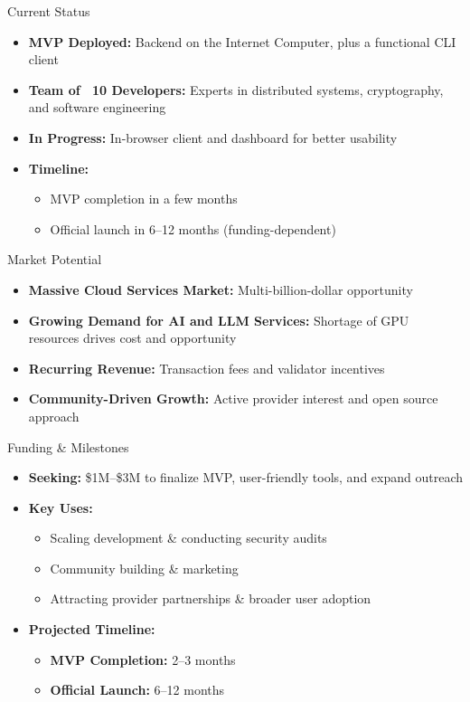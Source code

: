 \documentclass{beamer}
\begin{document}
\begin{frame}{Current Status}
\begin{itemize}
  \item \textbf{MVP Deployed:} Backend on the Internet Computer, plus a functional CLI client
  \item \textbf{Team of ~10 Developers:} Experts in distributed systems, cryptography, and software engineering
  \item \textbf{In Progress:} In-browser client and dashboard for better usability
  \item \textbf{Timeline:}
  \begin{itemize}
    \item MVP completion in a few months
    \item Official launch in 6--12 months (funding-dependent)
  \end{itemize}
\end{itemize}
\end{frame}

\begin{frame}{Market Potential}
\begin{itemize}
  \item \textbf{Massive Cloud Services Market:} Multi-billion-dollar opportunity
  \item \textbf{Growing Demand for AI and LLM Services:} Shortage of GPU resources drives cost and opportunity
  \item \textbf{Recurring Revenue:} Transaction fees and validator incentives
  \item \textbf{Community-Driven Growth:} Active provider interest and open source approach
\end{itemize}
\end{frame}

\begin{frame}{Funding \& Milestones}
\begin{itemize}
  \item \textbf{Seeking:} \$1M--\$3M to finalize MVP, user-friendly tools, and expand outreach
  \item \textbf{Key Uses:}
    \begin{itemize}
      \item Scaling development \& conducting security audits
      \item Community building \& marketing
      \item Attracting provider partnerships \& broader user adoption
    \end{itemize}
  \item \textbf{Projected Timeline:}
    \begin{itemize}
      \item \textbf{MVP Completion:} 2--3 months
      \item \textbf{Official Launch:} 6--12 months
    \end{itemize}
\end{itemize}
\end{frame}
\end{document}
